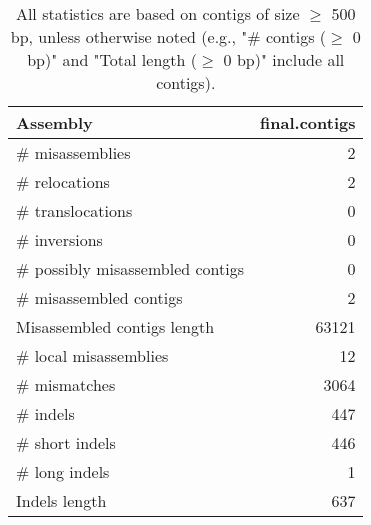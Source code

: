 \documentclass[12pt,a4paper]{article}
\begin{document}
\begin{table}[ht]
\begin{center}
\caption{All statistics are based on contigs of size $\geq$ 500 bp, unless otherwise noted (e.g., "\# contigs ($\geq$ 0 bp)" and "Total length ($\geq$ 0 bp)" include all contigs).}
\begin{tabular}{|l*{1}{|r}|}
\hline
Assembly & final.contigs \\ \hline
\# misassemblies & 2 \\ \hline
\hspace{5mm}\# relocations & 2 \\ \hline
\hspace{5mm}\# translocations & 0 \\ \hline
\hspace{5mm}\# inversions & 0 \\ \hline
\# possibly misassembled contigs & 0 \\ \hline
\# misassembled contigs & 2 \\ \hline
Misassembled contigs length & 63121 \\ \hline
\# local misassemblies & 12 \\ \hline
\# mismatches & 3064 \\ \hline
\# indels & 447 \\ \hline
\hspace{5mm}\# short indels & 446 \\ \hline
\hspace{5mm}\# long indels & 1 \\ \hline
Indels length & 637 \\ \hline
\end{tabular}
\end{center}
\end{table}
\end{document}
